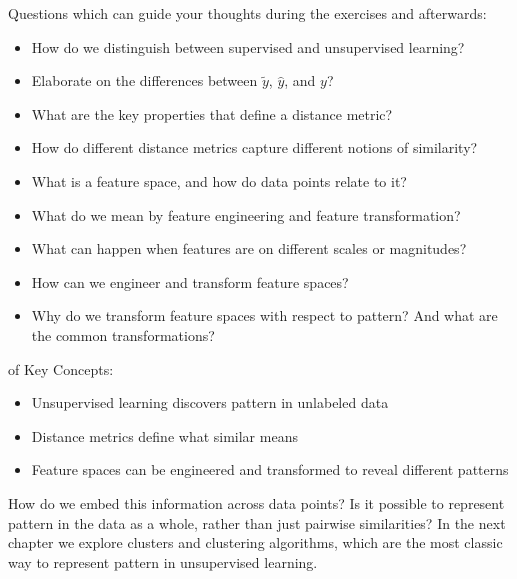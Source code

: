  Questions which can guide your thoughts during the exercises and afterwards:
\begin{itemize}
    \item How do we distinguish between supervised and unsupervised learning?
    \item Elaborate on the differences between $\tilde{y}$, $\hat{y}$, and $y$?
    \item What are the key properties that define a distance metric?
    \item How do different distance metrics capture different notions of similarity?
    \item What is a feature space, and how do data points relate to it? 
    \item What do we mean by feature engineering and feature transformation?
    \item What can happen when features are on different scales or magnitudes?
    \item How can we engineer and transform feature spaces?
    \item Why do we transform feature spaces with respect to pattern? And what are the common transformations?
\end{itemize}

 of Key Concepts:
\begin{itemize}
    \item Unsupervised learning discovers pattern in unlabeled data
    \item Distance metrics define what similar means
    \item Feature spaces can be engineered and transformed to reveal different patterns
\end{itemize}

 How do we embed this information across data points?
Is it possible to represent pattern in the data as a whole, rather than just pairwise similarities?
In the next chapter we explore clusters and clustering algorithms, which are the most classic way to represent pattern in unsupervised learning. 


